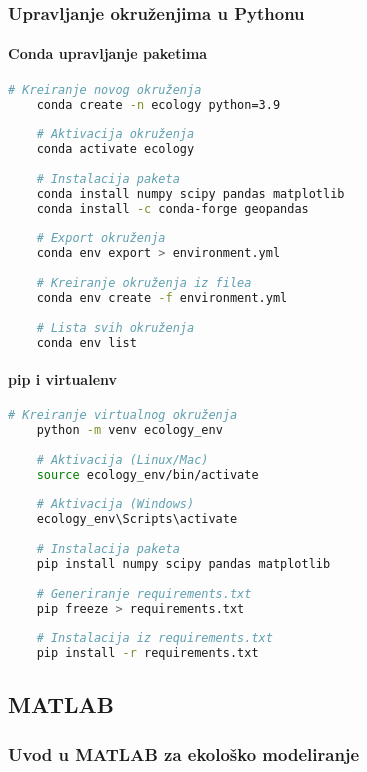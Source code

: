 \documentclass[11pt,oneside]{book}
\begin{document}
\subsubsection{Upravljanje okruženjima u Pythonu}

\paragraph{Conda upravljanje paketima}

\begin{lstlisting}[language=bash, caption=Conda environment management]
	# Kreiranje novog okruženja
	conda create -n ecology python=3.9
	
	# Aktivacija okruženja
	conda activate ecology
	
	# Instalacija paketa
	conda install numpy scipy pandas matplotlib
	conda install -c conda-forge geopandas
	
	# Export okruženja
	conda env export > environment.yml
	
	# Kreiranje okruženja iz filea
	conda env create -f environment.yml
	
	# Lista svih okruženja
	conda env list
\end{lstlisting}

\paragraph{pip i virtualenv}

\begin{lstlisting}[language=bash, caption=pip package management]
	# Kreiranje virtualnog okruženja
	python -m venv ecology_env
	
	# Aktivacija (Linux/Mac)
	source ecology_env/bin/activate
	
	# Aktivacija (Windows)
	ecology_env\Scripts\activate
	
	# Instalacija paketa
	pip install numpy scipy pandas matplotlib
	
	# Generiranje requirements.txt
	pip freeze > requirements.txt
	
	# Instalacija iz requirements.txt
	pip install -r requirements.txt
\end{lstlisting}

\subsection{MATLAB}

\subsubsection{Uvod u MATLAB za ekološko modeliranje}
\end{document}
